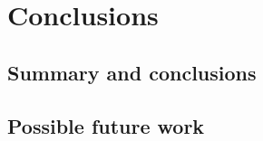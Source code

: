 \documentclass[main]{subfiles}
\begin{document}


\chapter{Conclusions}

\section{Summary and conclusions}

\section{Possible future work}
\end{document}
